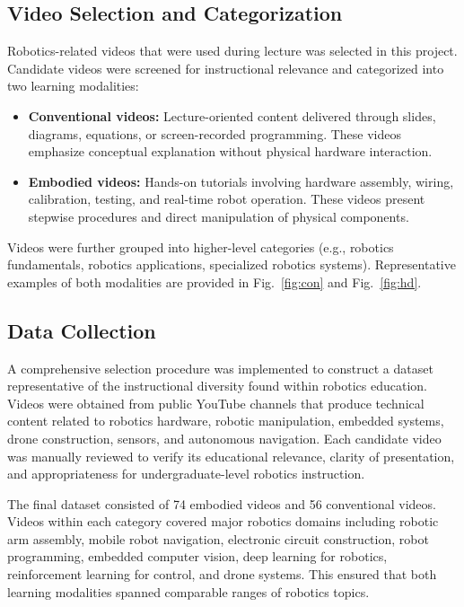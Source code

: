 \subsection{Video Selection and Categorization}

Robotics-related videos that were used during lecture was selected in this project. Candidate videos were screened for instructional relevance and categorized into two learning modalities:

\begin{itemize}
\item \textbf{Conventional videos:} Lecture-oriented content delivered through slides, diagrams, equations, or screen-recorded programming. These videos emphasize conceptual explanation without physical hardware interaction.
\item \textbf{Embodied videos:} Hands-on tutorials involving hardware assembly, wiring, calibration, testing, and real-time robot operation. These videos present stepwise procedures and direct manipulation of physical components.
\end{itemize}

Videos were further grouped into higher-level categories (e.g., robotics fundamentals, robotics applications, specialized robotics systems). Representative examples of both modalities are provided in Fig.~\ref{fig:con} and Fig.~\ref{fig:hd}.

\subsection {Data Collection}

A comprehensive selection procedure was implemented to construct a dataset representative of the instructional diversity found within robotics education. Videos were obtained from public YouTube channels that produce technical content related to robotics hardware, robotic manipulation, embedded systems, drone construction, sensors, and autonomous navigation. Each candidate video was manually reviewed to verify its educational relevance, clarity of presentation, and appropriateness for undergraduate-level robotics instruction.

The final dataset consisted of 74 embodied videos and 56 conventional videos. Videos within each category covered major robotics domains including robotic arm assembly, mobile robot navigation, electronic circuit construction, robot programming, embedded computer vision, deep learning for robotics, reinforcement learning for control, and drone systems. This ensured that both learning modalities spanned comparable ranges of robotics topics.

